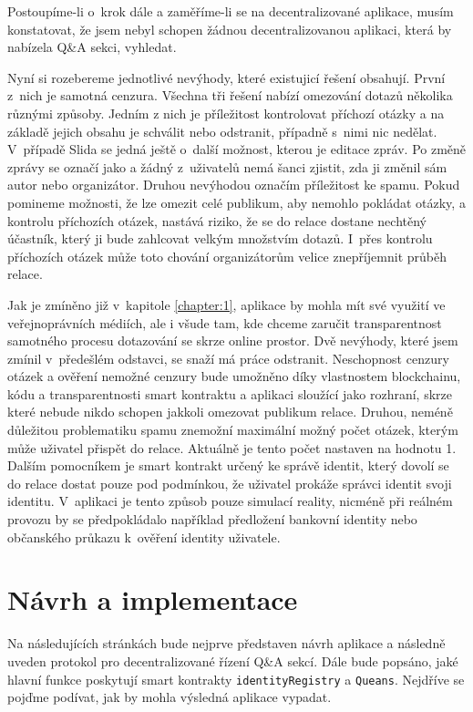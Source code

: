 Postoupíme-li o~krok dále a zaměříme-li se na decentralizované aplikace, musím konstatovat, že jsem nebyl schopen žádnou decentralizovanou aplikaci, která by nabízela Q\&A sekci, vyhledat. 

Nyní si rozebereme jednotlivé nevýhody, které existujicí řešení obsahují. První z~nich je samotná cenzura. Všechna tři řešení nabízí omezování dotazů několika různými způsoby. Jedním z nich je příležitost kontrolovat příchozí otázky a na základě jejich obsahu je schválit nebo odstranit, případně s~nimi nic nedělat. V~případě Slida se jedná ještě o~další možnost, kterou je editace zpráv. Po změně zprávy se označí jako  a žádný z~uživatelů nemá šanci zjistit, zda ji změnil sám autor nebo organizátor. Druhou nevýhodou označím příležitost ke spamu. Pokud pomineme možnosti, že lze omezit celé publikum, aby nemohlo pokládat otázky, a kontrolu příchozích otázek, nastává riziko, že se do relace dostane nechtěný účastník, který ji bude zahlcovat velkým množstvím dotazů. I~přes kontrolu příchozích otázek může toto chování organizátorům velice znepříjemnit průběh relace.

Jak je zmíněno již v~kapitole \ref{chapter:1}, aplikace by mohla mít své využití ve veřejnoprávních médiích, ale i všude tam, kde chceme zaručit transparentnost samotného procesu dotazování se skrze online prostor. Dvě nevýhody, které jsem zmínil v~předešlém odstavci, se snaží má práce odstranit. Neschopnost cenzury otázek a ověření nemožné cenzury bude umožněno díky vlastnostem blockchainu, kódu a transparentnosti smart kontraktu a aplikaci sloužící jako rozhraní, skrze které nebude nikdo schopen jakkoli omezovat publikum relace. Druhou, neméně důležitou problematiku spamu znemožní maximální možný počet otázek, kterým může uživatel přispět do relace. Aktuálně je tento počet nastaven na hodnotu 1. Dalším pomocníkem je smart kontrakt určený ke správě identit, který dovolí se do relace dostat pouze pod podmínkou, že uživatel prokáže správci identit svoji identitu. V~aplikaci je tento způsob pouze simulací reality, nicméně při reálném provozu by se předpokládalo například předložení bankovní identity nebo občanského průkazu k~ověření identity uživatele.

\chapter{Návrh a implementace}
\label{chapter:6}
Na následujících stránkách bude nejprve představen návrh aplikace a následně uveden protokol pro decentralizované řízení Q\&A sekcí. Dále bude popsáno, jaké hlavní funkce poskytují smart kontrakty \texttt{identityRegistry} a \texttt{Queans}. Nejdříve se pojďme podívat, jak by mohla výsledná aplikace vypadat.

